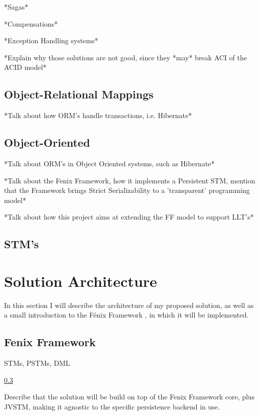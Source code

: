 \documentclass{llncs}
\begin{document}
\cite{alonso1996advanced}

*Sagas* \cite{garcia1987sagas}

\cite{798492}

*Compensations*

*Exception Handling systems*

*Explain why those solutions are not good, since they *may* break ACI
of the ACID model*

\subsection{Object-Relational Mappings}

*Talk about how ORM's handle transactions, i.e. Hibernate*

\subsection{Object-Oriented}

*Talk about ORM's in Object Oriented systems, such as Hibernate*

*Talk about the Fenix Framework, how it implements a Persistent STM,
mention that the Framework brings Strict Serializability to a
'transparent' programming model* \cite{fernandes2011strict} 
\cite{guerraoui2008correctness} \cite{cachopo2006versioned}

*Talk about how this project aims at extending the FF model to support LLT's*

\subsection{STM's}
\label{sec:stm}


\section{Solution Architecture}

In this section I will describe the architecture of my proposed
solution, as well as a small introduction to the Fénix Framework
\cite{fernandes2011strict}, in which it will be implemented.

\subsection{Fenix Framework}

STMs, PSTMs, DML

\ref{sec:stm}

Describe that the solution will be build on top of the Fenix Framework
core, plus JVSTM, making it agnostic to the specific persistence
backend in use. 
\end{document}
